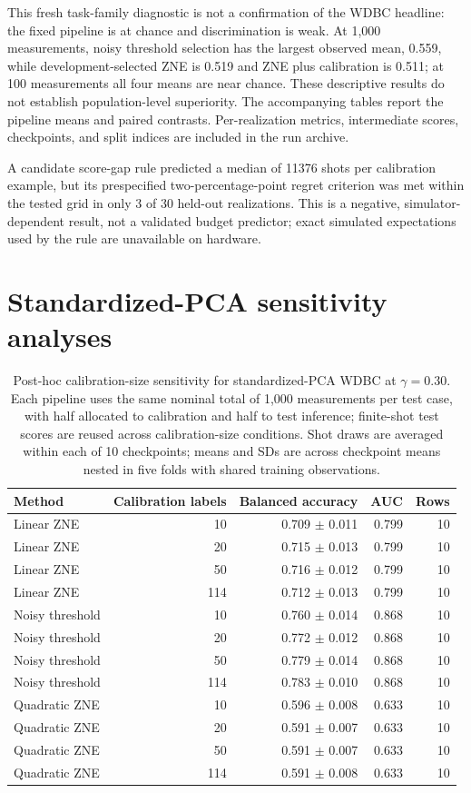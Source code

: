 \documentclass[10pt]{article}
\begin{document}
This fresh task-family diagnostic is not a confirmation of the WDBC headline: the fixed pipeline is at chance and discrimination is weak. At 1,000 measurements, noisy threshold selection has the largest observed mean, 0.559, while development-selected ZNE is 0.519 and ZNE plus calibration is 0.511; at 100 measurements all four means are near chance. These descriptive results do not establish population-level superiority. The accompanying tables report the pipeline means and paired contrasts. Per-realization metrics, intermediate scores, checkpoints, and split indices are included in the run archive.

A candidate score-gap rule predicted a median of 11376 shots per calibration example, but its prespecified two-percentage-point regret criterion was met within the tested grid in only 3 of 30 held-out realizations. This is a negative, simulator-dependent result, not a validated budget predictor; exact simulated expectations used by the rule are unavailable on hardware.

\clearpage
\section*{Standardized-PCA sensitivity analyses}

\begin{table}[H]\centering\scriptsize
\caption{Post-hoc calibration-size sensitivity for standardized-PCA WDBC at $\gamma=0.30$. Each pipeline uses the same nominal total of 1,000 measurements per test case, with half allocated to calibration and half to test inference; finite-shot test scores are reused across calibration-size conditions. Shot draws are averaged within each of 10 checkpoints; means and SDs are across checkpoint means nested in five folds with shared training observations.}
\label{tab:calsize}
\begin{tabular}{@{}l r r r r@{}}\toprule
Method & Calibration labels & Balanced accuracy & AUC & Rows \\ \midrule
Linear ZNE & 10 & 0.709 $\pm$ 0.011 & 0.799 & 10 \\
Linear ZNE & 20 & 0.715 $\pm$ 0.013 & 0.799 & 10 \\
Linear ZNE & 50 & 0.716 $\pm$ 0.012 & 0.799 & 10 \\
Linear ZNE & 114 & 0.712 $\pm$ 0.013 & 0.799 & 10 \\
Noisy threshold & 10 & 0.760 $\pm$ 0.014 & 0.868 & 10 \\
Noisy threshold & 20 & 0.772 $\pm$ 0.012 & 0.868 & 10 \\
Noisy threshold & 50 & 0.779 $\pm$ 0.014 & 0.868 & 10 \\
Noisy threshold & 114 & 0.783 $\pm$ 0.010 & 0.868 & 10 \\
Quadratic ZNE & 10 & 0.596 $\pm$ 0.008 & 0.633 & 10 \\
Quadratic ZNE & 20 & 0.591 $\pm$ 0.007 & 0.633 & 10 \\
Quadratic ZNE & 50 & 0.591 $\pm$ 0.007 & 0.633 & 10 \\
Quadratic ZNE & 114 & 0.591 $\pm$ 0.008 & 0.633 & 10 \\
\bottomrule\end{tabular}\end{table}
\end{document}

